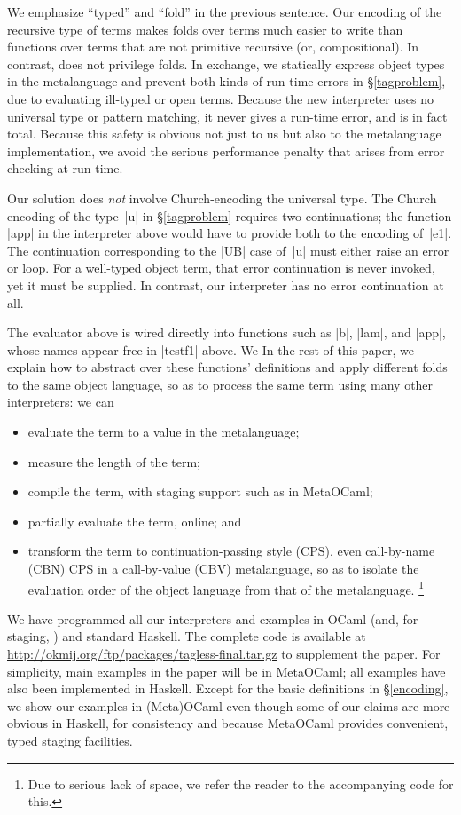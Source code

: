 We emphasize ``typed'' and ``fold'' in the previous sentence.
Our encoding of the recursive type of terms \citep{bohm-automatic}
makes folds over terms much easier to write than functions over
terms that are not primitive recursive (or, compositional).
In contrast, \citet{JFP-Mogensen} does not privilege folds.
In exchange, we statically express object types in the metalanguage
and prevent both kinds of run-time errors in
\S\ref{tagproblem}, due to evaluating ill-typed or open terms.
Because the new interpreter
uses no universal type or pattern matching, it never gives a
run-time error, and is in fact total.  Because this safety is obvious
not just to us but also to the metalanguage implementation, we avoid
the serious performance penalty \citep{WalidICFP02}
that arises from error checking at run time.

Our solution does \emph{not} involve Church-encoding the
universal type. The Church encoding of the type~|u| in \S\ref{tagproblem}
requires two continuations; the function |app| in the interpreter above would
have to provide both to the encoding of~|e1|. The continuation
corresponding to the |UB| case of~|u| must either raise an error or
loop. For a well-typed object term, that error continuation is never
invoked, yet it must be supplied. In contrast, our interpreter has no error
continuation at all.

The evaluator above is wired directly into
functions such as |b|, |lam|, and |app|, whose names appear
free in |testf1| above.
\ifshort We \else In the rest of this paper, we \fi
explain how to abstract over these functions' definitions
and apply different folds to the same object language, so as
to process the same term using many other
interpreters: we can
\begin{itemize}
    \item evaluate the term to a value in the metalanguage;
    \item measure the length of the term;
    \item compile the term, with staging support such as in MetaOCaml;
    \item partially evaluate the term, online; and
    \item transform the term to continuation\hyp passing style (CPS),
        even call-by-name (CBN) CPS in a call-by-value (CBV) metalanguage,
        so as to isolate the evaluation
        order of the object language from that of the metalanguage.\ifshort
\footnote{Due to serious lack of space, 
we refer the reader to the accompanying code for this.}\fi
\end{itemize}
We have programmed all our interpreters and examples in OCaml (and, for staging,
\citet{metaocaml}) and standard Haskell. The complete code is
available at \url{http://okmij.org/ftp/packages/tagless-final.tar.gz}
to supplement the paper. 
\ifshort For simplicity, main examples in the paper will be in MetaOCaml;
all examples have also been implemented in Haskell.
\else Except for the basic definitions in \S\ref{encoding},
we show our examples in (Meta)OCaml even though some of our
claims are more obvious in Haskell, for consistency and because
MetaOCaml provides convenient, typed staging facilities.
\fi

